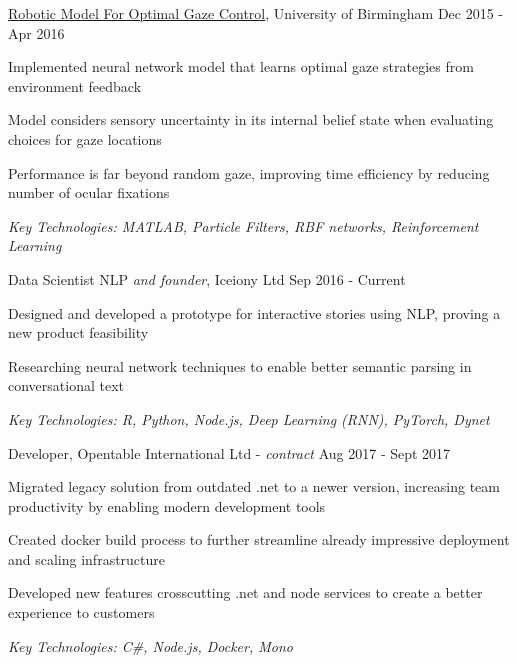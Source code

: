 \documentclass[11pt,article,oneside]{memoir}
\newenvironment{itemize*}{%
  \renewcommand\labelitemi{\textbullet}
  \footnotesize
  \begin{itemize}%
    \setlength{\itemsep}{0pt}}%
  {\end{itemize}
}
\begin{document}
\newpage 

\normalsize
\medskip
\ind \href{https://github.com/iceiony/gaze-control/}{Robotic Model For Optimal Gaze Control}, University of Birmingham \hfill Dec 2015 - Apr 2016
\begin{itemize*}
  \item Implemented neural network model that learns optimal gaze strategies from environment feedback
  \item Model considers sensory uncertainty in its internal belief state when evaluating choices for gaze locations
  \item Performance is far beyond random gaze, improving time efficiency by reducing number of ocular fixations 
\end{itemize*}
\ind \hspace{0.35in} \footnotesize \emph{Key Technologies: MATLAB, Particle Filters, RBF networks, Reinforcement Learning}

\bigskip 


\normalsize
\medskip
\ind Data Scientist NLP \emph{and founder}, Iceiony Ltd \hfill Sep 2016 - Current
\begin{itemize*}
  \item Designed and developed a prototype for interactive stories using NLP, proving a new product feasibility 
  \item Researching neural network techniques to enable better semantic parsing in conversational text 
\end{itemize*}
\ind \hspace{0.35in} \footnotesize \emph{Key Technologies: R, Python, Node.js, Deep Learning (RNN), PyTorch, Dynet}

\normalsize
\medskip
\ind Developer, Opentable International Ltd - \emph{contract} \hfill Aug 2017 - Sept 2017
\begin{itemize*}
  \item Migrated legacy solution from outdated .net to a newer version, increasing team productivity by enabling modern development tools 
  \item Created docker build process to further streamline already impressive deployment and scaling infrastructure 
  \item Developed new features crosscutting .net and node services to create a better experience to customers
\end{itemize*}
\ind \hspace{0.35in} \footnotesize \emph{Key Technologies: C\#, Node.js, Docker, Mono}
\end{document}
